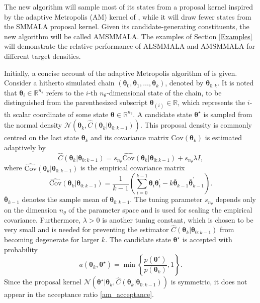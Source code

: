 \documentclass[twoside,11pt]{article}
\begin{document}
{The new algorithm will sample most of its states from a proposal kernel inspired by the adaptive Metropolis (AM) kernel of
\cite{haa_sak_tam__ana}, while it will draw fewer states from the SMMALA proposal kernel. Given its candidate-generating
constituents, the new algorithm will be called AMSMMALA. The examples of Section \ref{Examples} will demonstrate the
relative performance of ALSMMALA and AMSMMALA for different target densities.

Initially, a concise account of the adaptive Metropolis algorithm of \cite{haa_sak_tam__ana} is given. Consider a hitherto
simulated chain $(\boldsymbol{\theta}_{0}, \boldsymbol{\theta}_{1},\dots,\boldsymbol{\theta}_{k})$, denoted by 
$\boldsymbol{\theta}_{0:k}$. It is noted that $\boldsymbol{\theta}_{i}\in\mathbb{R}^{n_{\theta}}$ refers to the $i$-th 
$n_{\theta}$-dimensional state of the chain, to 
be distinguished from the parenthesized subscript $\boldsymbol{\theta}_{(i)}\in\mathbb{R}$, which represents the $i$-th 
scalar coordinate of some state $\boldsymbol{\theta}\in\mathbb{R}^{n_{\theta}}$. A candidate state 
$\boldsymbol{\theta}^{\star}$ is sampled from the normal density
$\mathcal{N}(\boldsymbol{\theta}_{k}, \hat{C}(\boldsymbol{\theta}_{k}|\boldsymbol{\theta}_{0:k-1}))$. This proposal density 
is commonly centred on the last state $\boldsymbol{\theta}_{k}$ and its covariance matrix 
$\mbox{Cov}(\boldsymbol{\theta}_{k})$ is estimated adaptively by
\begin{equation}
\label{am_c}
\hat{C}(\boldsymbol{\theta}_{k}|\boldsymbol{\theta}_{0:k-1})=
s_{n_{\theta}}\widehat{\mbox{Cov}}(\boldsymbol{\theta}_{k}|\boldsymbol{\theta}_{0:k-1})+
s_{n_{\theta}}\lambda I,
\end{equation}
where $\widehat{\mbox{Cov}}(\boldsymbol{\theta}_{k}|\boldsymbol{\theta}_{0:k-1})$ is the empirical covariance 
matrix
\begin{equation}
\label{am_cov}
\widehat{\mbox{Cov}}(\boldsymbol{\theta}_{k}|\boldsymbol{\theta}_{0:k-1})=
\frac{1}{k-1}\left(
\sum_{i=0}^{k-1}\boldsymbol{\theta}_{i}\boldsymbol{\theta}_{i}^{'}-
k\bar{\boldsymbol{\theta}}_{k-1}\bar{\boldsymbol{\theta}}_{k-1}^{'}
\right).
\end{equation}
$\bar{\boldsymbol{\theta}}_{k-1}$ denotes the sample mean of $\boldsymbol{\theta}_{0:k-1}$. The tuning parameter 
$s_{n_{\theta}}$ depends only on the dimension $n_{\theta}$ of the parameter space and is used for scaling the empirical 
covariance. Furthermore, $\lambda>0$ is another tuning constant, which is chosen to be very small and is needed for 
preventing the estimator $\hat{C}(\boldsymbol{\theta}_{k}|\boldsymbol{\theta}_{0:k-1})$ from becoming degenerate for larger 
$k$. The candidate state $\boldsymbol{\theta}^{\star}$ is accepted with probability
\begin{equation}
\label{am_acceptance}
a(\boldsymbol{\theta}_{k},\boldsymbol{\theta}^{\star}) =
\min\left\{
\frac{p(\boldsymbol{\theta}^{\star})}{p(\boldsymbol{\theta}_{k})}
, 1
\right\}.
\end{equation}
Since the proposal kernel
$
\mathcal{N}(\boldsymbol{\theta}^{\star}|\boldsymbol{\theta}_{k}, 
\hat{C}(\boldsymbol{\theta}_{k}|\boldsymbol{\theta}_{0:k-1}))
$
is symmetric, it does not appear in the acceptance ratio \eqref{am_acceptance}.

}
\end{document}
